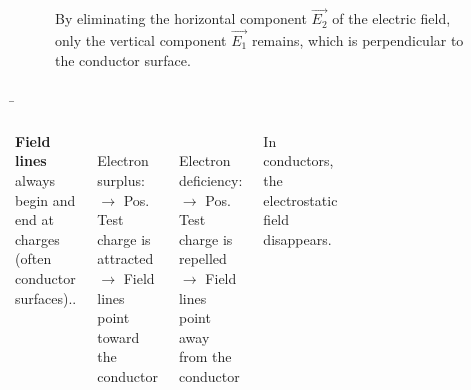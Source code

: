 \begin{frame}
{	 \begin{figure}[h!]
		\renewcommand{\figurename}{Figure}
		\centering
		
		\caption{By eliminating the horizontal component $\vec{E_2}$ of the electric field, only the vertical component $\vec{E_1}$ remains, 
		which is perpendicular to the conductor surface.}
		\label{fig:e_vertikal}
	\end{figure}

	}
	
	
	\b{

	\begin{columns}

	   \textbf{Field lines} always begin and end at charges (often conductor surfaces)..
		
		
		\phantom{.}\\

		
			Electron surplus:\\
			$\rightarrow$ Pos. Test charge is attracted\\
			$\rightarrow$ Field lines point toward the conductor
			
			\phantom{.}\\


			Electron deficiency:\\
			$\rightarrow$ Pos. Test charge is repelled\\
			$\rightarrow$ Field lines point away from the conductor
			

			\begin{Key point}{}
			In conductors, the electrostatic\\ 
			field disappears.
			\end{Key point}
	
		\begin{figure}[h!]
			\centering
			
		\end{figure}   

		\begin{figure}[h!]
			\centering
			
		\end{figure}   


\end{columns}}
\end{frame}
